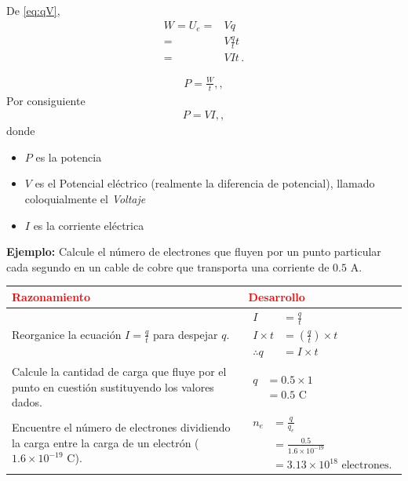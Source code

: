 \documentclass[11pt,a4paper]{book}
\renewcommand{\arraystretch}{1.9}
\begin{document}
De \eqref{eq:qV},
\begin{align}
   W = U_e =& V q\nonumber\\
           = & V \frac{q}{t} t\nonumber\\
           = & V I t\,.
\end{align}

\begin{align}
    P = \frac{W}{t},,
\end{align}
Por consiguiente
\begin{align}
    P = VI,,
\end{align}
donde
\begin{itemize}
    \item $P$ es la potencia
    \item  $V$ es el Potencial eléctrico (realmente la diferencia de potencial), llamado coloquialmente el 
    \emph{Voltaje}
    \item $I$ es la corriente eléctrica
\end{itemize}

\newpage
\textbf{Ejemplo:} Calcule el número de electrones que fluyen por un punto particular cada segundo en un cable de cobre que transporta una corriente de $0.5 \text{ A}$.

\begin{table}[htbp]
\centering
\renewcommand{\arraystretch}{1.5}
\begin{tabular}{|p{}|p{}|}
\hline
\textbf{\textcolor{red}{Razonamiento}} & \textbf{\textcolor{red}{Desarrollo}} \\
\hline
Reorganice la ecuación $I = \frac{q}{t}$ para despejar $q$. & 
$\begin{aligned}
    I &= \frac{q}{t} \\
    I \times t &= \left(\frac{q}{t}\right) \times t \\
    \therefore q &= I \times t
\end{aligned}$ \\
\hline
Calcule la cantidad de carga que fluye por el punto en cuestión sustituyendo los valores dados. & 
$\begin{aligned}
    q &= 0.5 \times 1 \\
      &= 0.5 \text{ C}
\end{aligned}$ \\
\hline
Encuentre el número de electrones dividiendo la carga entre la carga de un electrón ($1.6 \times 10^{-19} \text{ C}$). & 
$\begin{aligned}
    n_e &= \frac{q}{q_e} \\
        &= \frac{0.5}{1.6 \times 10^{-19}} \\
        &= 3.13 \times 10^{18} \text{ electrones.}
\end{aligned}$ \\
\hline
\end{tabular}
\end{table}
\end{document}

